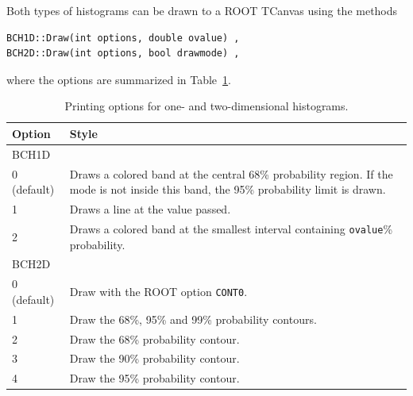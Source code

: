 \documentclass[11pt, a4paper]{article}
\newcommand{\BAT}{{\sc BAT}}
\begin{document}
\noindent 
Both types of histograms can be drawn to a ROOT TCanvas using the
methods
%
\begin{verbatim}
BCH1D::Draw(int options, double ovalue) , 
BCH2D::Draw(int options, bool drawmode) , 
\end{verbatim}  
%
where the options are summarized in Table~\ref{table:printingoptions}.

\begin{table}[ht!]
\begin{tabular}{ll}
\hline
Option & Style \\ 
\hline
BCH1D & \\ 
\hline 
0 (default) & \begin{minipage}[l]{12 cm}Draws a colored band at the central 68\% probability region. If the mode is not inside this band, the 95\% probability limit is drawn. \end{minipage}\\ 
1           & Draws a line at the value passed. \\ 
2           & Draws a colored band at the smallest interval containing \verb|ovalue|\% probability. \\
\hline 
BCH2D & \\ 
\hline 
0 (default) & Draw with the ROOT option \verb|CONT0|. \\ 
1           & Draw the 68\%, 95\% and 99\% probability contours. \\ 
2           & Draw the 68\% probability contour. \\ 
3           & Draw the 90\% probability contour. \\ 
4           & Draw the 95\% probability contour. \\ 
\hline
\end{tabular}
\caption{Printing options for one- and two-dimensional histograms. 
\label{table:printingoptions}} 
\end{table}



\end{document}

